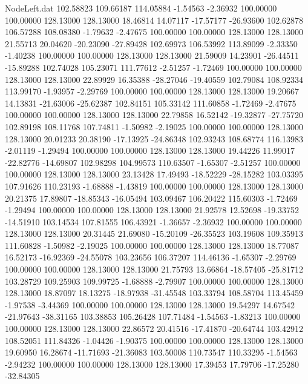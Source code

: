 \begin{filecontents}{NodeLeft.dat}
 102.58823  109.66187  114.05884    -1.54563   -2.36932  100.00000  100.00000  128.13000  128.13000   18.46814   14.07117  -17.57177  -26.93600
 102.62878  106.57288  108.08380    -1.79632   -2.47675  100.00000  100.00000  128.13000  128.13000   21.55713   20.04620  -20.23090  -27.89428
 102.69973  106.53992  113.89099    -2.33350   -1.40238  100.00000  100.00000  128.13000  128.13000   21.59009   14.23901  -26.44511  -15.89288
 102.74028  105.23071  111.77612    -2.51257   -1.72469  100.00000  100.00000  128.13000  128.13000   22.89929   16.35388  -28.27046  -19.40559
 102.79084  108.92334  113.99170    -1.93957   -2.29769  100.00000  100.00000  128.13000  128.13000   19.20667   14.13831  -21.63006  -25.62387
 102.84151  105.33142  111.60858    -1.72469   -2.47675  100.00000  100.00000  128.13000  128.13000   22.79858   16.52142  -19.32877  -27.75720
 102.89198  108.11768  107.74811    -1.50982   -2.19025  100.00000  100.00000  128.13000  128.13000   20.01233   20.38190  -17.13925  -24.86348
 102.93243  108.68774  116.13983    -2.01119   -1.29494  100.00000  100.00000  128.13000  128.13000   19.44226   11.99017  -22.82776  -14.69807
 102.98298  104.99573  110.63507    -1.65307   -2.51257  100.00000  100.00000  128.13000  128.13000   23.13428   17.49493  -18.52229  -28.15282
 103.03395  107.91626  110.23193    -1.68888   -1.43819  100.00000  100.00000  128.13000  128.13000   20.21375   17.89807  -18.85343  -16.05494
 103.09467  106.20422  115.60303    -1.72469   -1.29494  100.00000  100.00000  128.13000  128.13000   21.92578   12.52698  -19.33752  -14.51910
 103.14534  107.81555  106.43921    -1.36657   -2.36932  100.00000  100.00000  128.13000  128.13000   20.31445   21.69080  -15.20109  -26.35523
 103.19608  109.35913  111.60828    -1.50982   -2.19025  100.00000  100.00000  128.13000  128.13000   18.77087   16.52173  -16.92369  -24.55078
 103.23656  106.37207  114.46136    -1.65307   -2.29769  100.00000  100.00000  128.13000  128.13000   21.75793   13.66864  -18.57405  -25.81712
 103.28729  109.25903  109.99725    -1.68888   -2.79907  100.00000  100.00000  128.13000  128.13000   18.87097   18.13275  -18.97938  -31.45548
 103.33794  108.58704  113.45459    -1.97538   -3.44369  100.00000  100.00000  128.13000  128.13000   19.54297   14.67542  -21.97643  -38.31165
 103.38853  105.26428  107.71484    -1.54563   -1.83213  100.00000  100.00000  128.13000  128.13000   22.86572   20.41516  -17.41870  -20.64744
 103.42912  108.52051  111.84326    -1.04426   -1.90375  100.00000  100.00000  128.13000  128.13000   19.60950   16.28674  -11.71693  -21.36083
 103.50008  110.73547  110.33295    -1.54563   -2.94232  100.00000  100.00000  128.13000  128.13000   17.39453   17.79706  -17.25280  -32.84305

\end{filecontents}
